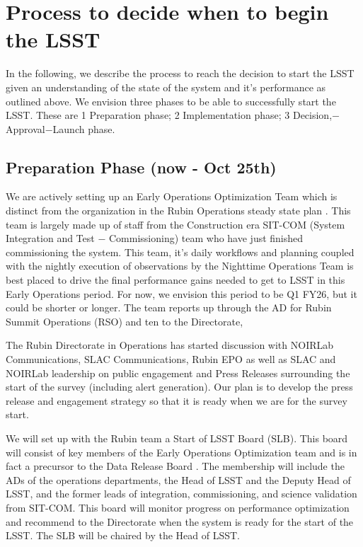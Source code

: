 \section{Process to decide when to begin the LSST}

In the following, we describe the process to reach the decision to start the LSST given an understanding of the state of the system and it's performance as outlined above. We envision three phases to be able to successfully start the LSST.  These are 1 Preparation phase; 2 Implementation phase; 3 Decision,$-$Approval$-$Launch phase. 

\subsection{Preparation Phase (now - Oct 25th)}

We are actively setting up an Early Operations Optimization Team which is distinct from the organization in the Rubin Operations steady state plan . This team is largely made up of staff from the Construction era SIT-COM (System Integration and Test $-$ Commissioning)  team who have just finished commissioning the system. This team, it's daily workflows and planning coupled with the nightly execution of observations by the Nighttime Operations Team is best placed to drive the final performance gains needed to get to LSST in this Early Operations period. For now, we envision this period to be Q1 FY26, but it could be shorter or longer. The team reports up through the AD for Rubin Summit Operations (RSO) and ten to the Directorate, 

The Rubin Directorate in Operations has started discussion with NOIRLab Communications, SLAC Communications, Rubin EPO as well as SLAC and NOIRLab leadership on public engagement and Press Releases surrounding the start of the survey (including alert generation). Our plan is to develop the press release and engagement strategy so that it is ready when we are for the survey start. 

We will set up with the Rubin team a Start of LSST Board (SLB). This board will consist of key members of the Early Operations Optimization team and is in fact a precursor to the Data Release Board \citep[DRB; see]{RDO-018}. The membership will include the ADs of the operations departments, the Head of LSST and the Deputy Head of LSST, and the former leads of integration, commissioning, and science validation from SIT-COM. This board will monitor progress on performance optimization and recommend to the Directorate when the system is ready for the start of the LSST. The SLB will be chaired by the Head of LSST.

